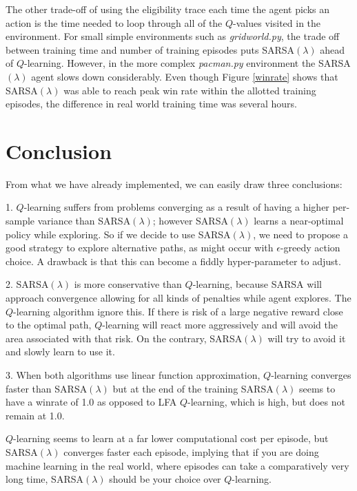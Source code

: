\documentclass[10pt,conference]{IEEEtran}
\begin{document}
	The other trade-off of using the eligibility trace each time the agent 
	picks an action is the time needed to loop through all of the \(Q\)-values
	visited in the environment. For small simple environments such as \textit{gridworld.py},
	the trade off between training time and number of training episodes puts 
	SARSA\((\lambda)\) ahead of \(Q\)-learning. However, in the more complex 
	\textit{pacman.py} environment the SARSA\((\lambda)\) agent slows down 
	considerably. Even though Figure \ref{winrate} shows that SARSA\((\lambda)\) 
	was able to reach peak win rate within the allotted training episodes,
	the difference in real world training time was several hours.

\section{Conclusion}
\label{sec:conclusion}
From what we have already implemented, we can easily draw three conclusions:

1. \(Q\)-learning suffers from problems converging as a result of having
a higher per-sample variance than SARSA\((\lambda)\); however SARSA\((\lambda)\) 
learns a near-optimal policy while exploring. So if we decide to use 
SARSA\((\lambda)\), we need to propose a good strategy to explore alternative 
paths, as might occur with \(\epsilon\)-greedy action choice. A drawback is that this
can become a fiddly hyper-parameter to adjust.

2. SARSA\((\lambda)\) is more conservative than \(Q\)-learning, because 
SARSA will approach convergence allowing for all kinds of penalties while 
agent explores. The \(Q\)-learning algorithm ignore this. 
If there is risk of a large negative reward close to the 
optimal path, \(Q\)-learning will react more aggressively and will avoid 
the area associated with that risk. On the contrary, SARSA\((\lambda)\) 
will try to avoid it and slowly learn to use it.

3. When both algorithms use linear function approximation, \(Q\)-learning 
converges faster than SARSA\((\lambda)\) but at the end of the training 
SARSA\((\lambda)\) seems to have a winrate of 1.0 as opposed to LFA 
\(Q\)-learning, which is high, but does not remain at 1.0.

\(Q\)-learning seems to learn at a far lower computational cost per episode, 
but SARSA\((\lambda)\) converges faster each episode, implying that if 
you are doing machine learning in the real world, 
where episodes can take a comparatively very long time, SARSA\((\lambda)\) 
should be your choice over \(Q\)-learning.
\end{document}

